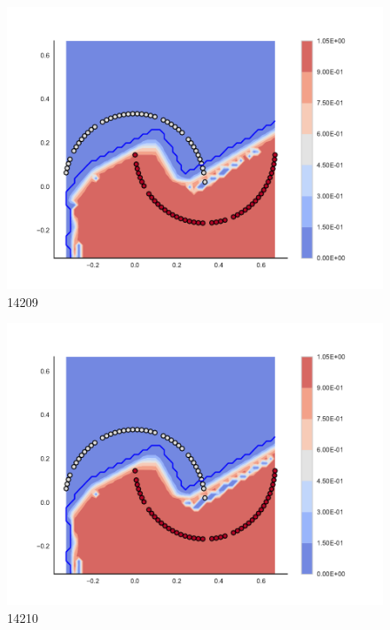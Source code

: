 \begin{subfigure}[b]{0.09\textwidth}
    \includegraphics[clip, trim=2.35cm 1.75cm 4.5cm 0cm,width=\textwidth]{img/convergence/14209.pdf}
    \caption{14209}
    \label{fig:convergence_14209}
\end{subfigure}
%
\begin{subfigure}[b]{0.09\textwidth}
    \includegraphics[clip, trim=2.35cm 1.75cm 4.5cm 0cm,width=\textwidth]{img/convergence/14210.pdf}
    \caption{14210}
    \label{fig:convergence_14210}
\end{subfigure}
%
